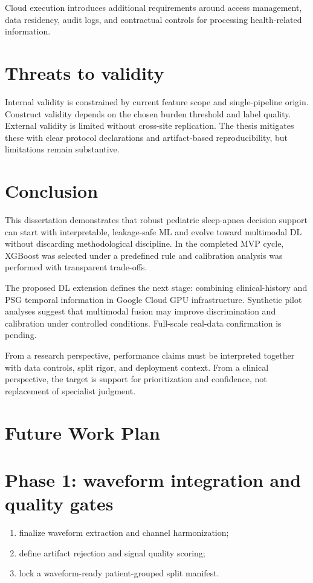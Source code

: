 \documentclass[10pt,a4paper,twocolumn]{article}
\newcommand{\chapter}[1]{\section{#1}}
\begin{document}
Cloud execution introduces additional requirements around access management, data residency, audit logs, and contractual controls for processing health-related information.

\section{Threats to validity}
Internal validity is constrained by current feature scope and single-pipeline origin. Construct validity depends on the chosen burden threshold and label quality. External validity is limited without cross-site replication. The thesis mitigates these with clear protocol declarations and artifact-based reproducibility, but limitations remain substantive.



\chapter{Conclusion}
This dissertation demonstrates that robust pediatric sleep-apnea decision support can start with interpretable, leakage-safe ML and evolve toward multimodal DL without discarding methodological discipline. In the completed MVP cycle, XGBoost was selected under a predefined rule and calibration analysis was performed with transparent trade-offs.

The proposed DL extension defines the next stage: combining clinical-history and PSG temporal information in Google Cloud GPU infrastructure. Synthetic pilot analyses suggest that multimodal fusion may improve discrimination and calibration under controlled conditions. Full-scale real-data confirmation is pending.

From a research perspective, performance claims must be interpreted together with data controls, split rigor, and deployment context. From a clinical perspective, the target is support for prioritization and confidence, not replacement of specialist judgment.

\chapter{Future Work Plan}
\section{Phase 1: waveform integration and quality gates}
\begin{enumerate}[leftmargin=1.2cm]
    \item finalize waveform extraction and channel harmonization;
    \item define artifact rejection and signal quality scoring;
    \item lock a waveform-ready patient-grouped split manifest.
\end{enumerate}
\end{document}
